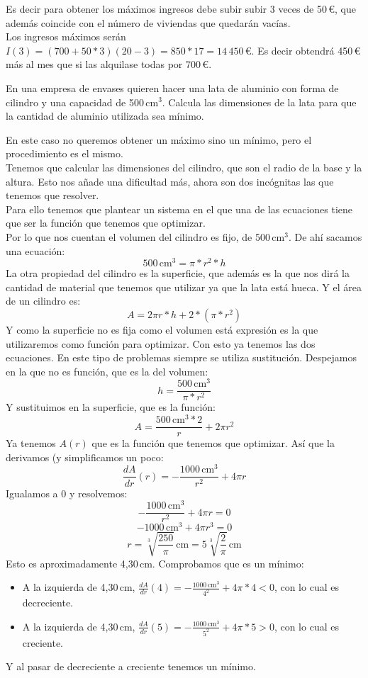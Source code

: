 \documentclass[a4paper,11pt,answers]{exam}
\begin{document}
\begin{questions}
\begin{questions}
\begin{solution}
Es decir para obtener los máximos ingresos debe subir subir 3 veces de 50\,€, que además coincide con el número de viviendas que quedarán vacías.\\
Los ingresos máximos serán $I(3) = (700 + 50*3)(20 - 3) = 850*17 = 14\,450$\,€. Es decir obtendrá 450\,€ más al mes que si las alquilase todas por 700\,€.
\end{solution}

\question En una empresa de envases quieren hacer una lata de aluminio con forma de cilindro y una capacidad de 500\,$\mathrm{cm}^3$. Calcula las dimensiones de la lata para que la cantidad de aluminio utilizada sea mínimo.
\begin{solution}
En este caso no queremos obtener un máximo sino un mínimo, pero el procedimiento es el mismo.\\

Tenemos que calcular las dimensiones del cilindro, que son el radio de la base y la altura. Esto nos añade una dificultad más, ahora son dos incógnitas las que tenemos que resolver.\\
Para ello tenemos que plantear un sistema en el que una de las ecuaciones tiene que ser la función que tenemos que optimizar.\\
Por lo que nos cuentan el volumen del cilindro es fijo, de 500\,$\mathrm{cm}^3$. De ahí sacamos una ecuación:
\[500\,\mathrm{cm}^3 = \pi*r^2 *h\]
La otra propiedad del cilindro es la superficie, que además es la que nos dirá la cantidad de material que tenemos que utilizar ya que la lata está hueca. Y el área de un cilindro es:
\[A = 2\pi r*h +2*(\pi*r^2)\]
Y como la superficie no es fija como el volumen está expresión es la que utilizaremos como función para optimizar.
Con esto ya tenemos las dos ecuaciones. En este tipo de problemas siempre se utiliza sustitución. Despejamos en la que no es función, que es la del volumen:
\[h = \frac{500\,\mathrm{cm}^3}{\pi * r^2}\]
Y sustituimos en la superficie, que es la función:
\[A = \frac{500\,\mathrm{cm}^3 * 2}{r} + 2\pi r^2\]
Ya tenemos $A(r)$ que es la función que tenemos que optimizar. Así que la derivamos (y simplificamos un poco:
\[\frac{dA}{dr}(r) = -\frac{1000\,\mathrm{cm}^3}{r^2} + 4\pi r\]
Igualamos a 0 y resolvemos:
\[-\frac{1000\,\mathrm{cm}^3}{r^2} + 4\pi r = 0\]
\[-1000\,\mathrm{cm}^3 + 4\pi r^3 = 0\]
\[r = \sqrt[3]{\frac{250}{\pi}}\,\mathrm{cm} = 5\sqrt[3]{\frac{2}{\pi}}\,\mathrm{cm}\]
Esto es aproximadamente 4,30\,cm. Comprobamos que es un mínimo:
\begin{itemize}
	\item A la izquierda de 4,30\,cm, $\frac{dA}{dr}(4)=
	-\frac{1000\,\mathrm{cm}^3}{4^2} + 4\pi * 4< 0$, con lo cual es decreciente.
	\item A la izquierda de 4,30\,cm, $\frac{dA}{dr}(5)=
	-\frac{1000\,\mathrm{cm}^3}{5^2} + 4\pi * 5> 0$, con lo cual es creciente.
\end{itemize}
Y al pasar de decreciente a creciente tenemos un mínimo.\\


\end{solution}
\end{questions}
\end{questions}
\end{document}
